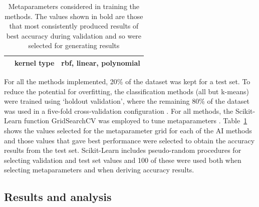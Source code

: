 \documentclass[12pt]{article}
\begin{document}
\begin{table}
\begin{center}
\begin{tabular}{l|l|l}
                        & kernel type                  & rbf, {\normalsize\textbf{linear}}, polynomial \\
  \hline
  \end{tabular}
  \vspace{-1.5\baselineskip} %
  \end{center} 
  \caption{Metaparameters considered in training the methods. 
  The values shown in bold are those that most consistently produced results of 
  best accuracy during validation and so were selected for generating results}
  \vspace{-1\baselineskip} %
  \label{tab:metaparameters}
\end{table} 


For all the methods implemented, 20\% of the dataset was kept for a test set. 
To reduce the potential for overfitting, the classification methods (all but k-means) were trained using ‘holdout validation’, 
where the remaining 80\% of the dataset was used in a five-fold cross-validation configuration \cite{james2013introduction}. For all methods, 
the Scikit-Learn function GridSearchCV was employed to tune metaparameters \cite{scikit-learn}. 
Table~\ref{tab:metaparameters} shows the values selected for the metaparameter grid for each of the AI methods 
and those values that gave best performance were selected to obtain the accuracy results from the test set. 
Scikit-Learn includes pseudo-random procedures for selecting validation and test set values and 100 of these were used 
both when selecting metaparameters and when deriving accuracy results.

\subsection*{Results and analysis}
\end{document}
